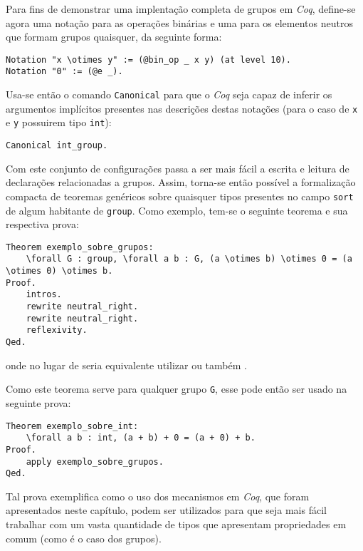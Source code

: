 Para fins de demonstrar uma implentação completa de grupos em \textit{Coq}, define-se agora uma notação para as operações binárias e uma para os elementos neutros que formam grupos quaisquer, da seguinte forma:
    \begin{lstlisting}[language = coq,frame=single,tabsize=1]
Notation "x \otimes y" := (@bin_op _ x y) (at level 10).
Notation "0" := (@e _).
    \end{lstlisting}
Usa-se então o comando \lstinline[language = coq]$Canonical$ para que o \textit{Coq} seja capaz de inferir os argumentos implícitos presentes nas descrições destas notações (para o caso de \lstinline[language = coq]$x$ e  \lstinline[language = coq]$y$ possuirem tipo  \lstinline[language = coq]$int$):
    \begin{lstlisting}[language = coq,frame=single,tabsize=1]
Canonical int_group.
    \end{lstlisting}
Com este conjunto de configurações passa a ser mais fácil a escrita e leitura de declarações relacionadas a grupos. Assim, torna-se então possível a formalização compacta de teoremas genéricos sobre quaisquer tipos presentes no campo \lstinline[language = coq]$sort$ de algum habitante de \lstinline[language = coq]$group$. Como exemplo, tem-se o seguinte teorema e sua respectiva prova:
    \begin{lstlisting}[language = coq,frame=single,tabsize=1, escapechar=@]
Theorem exemplo_sobre_grupos: 
    \forall G : group, \forall a b : G, (a \otimes b) \otimes 0 = (a \otimes 0) \otimes b.
Proof.
    intros.
    rewrite neutral_right. 
    rewrite neutral_right.
    reflexivity. 
Qed.
    \end{lstlisting}
onde no lugar de  seria equivalente utilizar  ou também . 

Como este teorema serve para qualquer grupo \lstinline[language = coq]$G$, esse pode então ser usado na seguinte prova:
    \begin{lstlisting}[language = coq,frame=single,tabsize=1]
Theorem exemplo_sobre_int:
    \forall a b : int, (a + b) + 0 = (a + 0) + b.
Proof.
    apply exemplo_sobre_grupos.
Qed.
    \end{lstlisting}
Tal prova exemplifica como o uso dos mecanismos em \textit{Coq}, que foram apresentados neste capítulo, podem ser utilizados para que seja mais fácil trabalhar com um vasta quantidade de tipos que apresentam propriedades em comum (como é o caso dos grupos).

